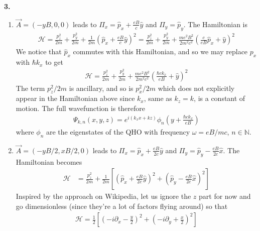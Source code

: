 \documentclass{article}
\theoremstyle{definition}
\newcommand{\p}{\partial}
\newcommand{\ham}{\mathcal{H}}
\newcommand{\f}[2]{\frac{#1}{#2}}
\newcommand{\lp}{\left(}
\newcommand{\rp}{\right)}
\newcommand{\lb}{\left[}
\newcommand{\rb}{\right]}
\begin{document}
\noindent \textbf{3. }
\begin{enumerate}[label=(\alph*)]
	\item $\vec{A} = (-yB,0,0)$ leads to $\Pi_x = \hat{p}_x + \f{eB}{c}\hat{y}$ and $\Pi_y = \hat{p}_y$. The Hamiltonian is 
	\begin{align*}
	\ham = \f{p_z^2}{2m} + \f{p_y^2}{2m} + \f{1}{2m}\lp \hat{p}_x + \f{eB}{c}\hat{y} \rp^2 =  \f{p_z^2}{2m} + \f{p_y^2}{2m} + \f{m e^2 B^2}{2m^2c^2}\lp \f{c}{eB}\hat{p}_x + \hat{y} \rp^2
	\end{align*} 
	We notice that $\hat{p}_x$ commutes with this Hamiltonian, and so we may replace $p_x$ with $\hbar k_x$ to get
	\begin{align*}
	\ham =  \f{p_z^2}{2m} + \f{p_y^2}{2m} + \f{m e^2 B^2}{2m^2c^2}\lp \f{\hbar c k_x}{eB} + \hat{y} \rp^2
	\end{align*}
	The term $p_z^2/2m$ is ancillary, and so is $p_x^2/2m$ which does not explicitly appear in the Hamiltonian above since $k_x$, same as $k_z=k$, is a constant of motion. The full wavefunction is therefore
	\begin{align*}
	\Psi_{k,n}(x,y,z) = e^{i(k_x x + k z )} \phi_n\lp y + \f{\hbar c k_x}{eB} \rp
	\end{align*}
	where $\phi_n$ are the eigenstates of the QHO with frequency $\omega = eB/mc$, $n\in \mathbb{N}$. 
	
	
	\item $\vec{A} = (-yB/2,xB/2,0)$ leads to $\Pi_x = \hat{p}_x + \f{eB}{2c}\hat{y}$ and $\Pi_y = \hat{p}_y - \f{eB}{2c} \hat{x}$. The Hamiltonian becomes
	\begin{align*}
	\ham &= \f{p_z^2}{2m} + \f{1}{2m}\lb \lp \hat{p}_x + \f{eB}{2c}\hat{y} \rp^2 + \lp \hat{p}_y - \f{eB}{2c} \hat{x} \rp^2 \rb 
	\end{align*}
	Inspired by the approach on Wikipedia, let us ignore the $z$ part for now and go dimensionless (since they're a lot of factors flying around) so that
	\begin{align*}
	\ham = \f{1}{2}\lb \lp -i\p_x - \f{y}{2} \rp^2 + \lp -i\p_y + \f{x}{2} \rp^2 \rb
	\end{align*}
	

\end{enumerate}
\end{document}
